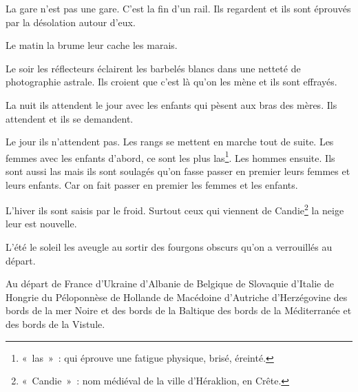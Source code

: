 
{\vspace*{-24pt}


La gare n'est pas une gare. C'est la fin d'un rail. Ils regardent et
ils sont éprouvés par la désolation autour d'eux.

Le matin la brume leur cache les marais.

Le soir les réflecteurs éclairent les barbelés blancs dans une netteté
de photographie astrale. Ils croient que c'est là qu'on les mène et
ils sont effrayés.

La nuit ils attendent le jour avec les enfants qui pèsent aux bras des
mères. Ils attendent et ils se demandent.

Le jour ils n'attendent pas. Les rangs se mettent en marche tout de
suite. Les femmes avec les enfants d'abord, ce sont les plus
las\footnote{«~las~»~: qui éprouve une fatigue physique, brisé,
éreinté.}. Les hommes ensuite. Ils sont aussi las mais ils sont
soulagés qu'on fasse passer en premier leurs femmes et leurs enfants.
Car on fait passer en premier les femmes et les enfants.

L'hiver ils sont saisis par le froid. Surtout ceux qui viennent de
Candie\footnote{«~Candie~»~: nom médiéval de la ville d'Héraklion, en
Crête.} la neige leur est nouvelle.

L'été le soleil les aveugle au sortir des fourgons obscurs qu'on a
verrouillés au départ.

Au départ de France d'Ukraine d'Albanie de Belgique de Slovaquie
d'Italie de Hongrie du Péloponnèse de Hollande de Macédoine
d'Autriche d'Herzégovine des bords de la mer Noire et des bords de la
Baltique des bords de la Méditerranée et des bords de la Vistule.

}
